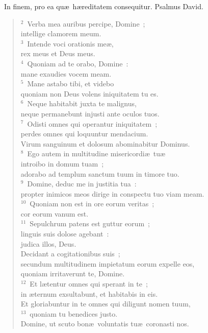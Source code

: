 ~\lettrine[lines=10,image=true,loversize=0.05,lraise=-0.03]{I}{}n finem, pro ea qu\ae\ h\ae reditatem consequitur. Psalmus David.
\begin{flushleft}\begin{verse}\vspace{6pt}${}^{2}$~Verba mea auribus percipe, Domine~;\\ intellige clamorem meum.\\
${}^{3}$~Intende voci orationis me\ae ,\\ rex meus et Deus meus.\\
${}^{4}$~Quoniam ad te orabo, Domine~:\\ mane exaudies vocem meam.\\
${}^{5}$~Mane astabo tibi, et videbo\\ quoniam non Deus volens iniquitatem tu es.\\
${}^{6}$~Neque habitabit juxta te malignus,\\ neque permanebunt injusti ante oculos tuos.\\
${}^{7}$~Odisti omnes qui operantur iniquitatem~;\\ perdes omnes qui loquuntur mendacium.\\ Virum sanguinum et dolosum abominabitur Dominus.\\
${}^{8}$~Ego autem in multitudine misericordi\ae\ tu\ae \\ introibo in domum tuam~;\\ adorabo ad templum sanctum tuum in timore tuo.\\
${}^{9}$~Domine, deduc me in justitia tua~:\\ propter inimicos meos dirige in conspectu tuo viam meam.\\
${}^{10}$~Quoniam non est in ore eorum veritas~;\\ cor eorum vanum est.\\
${}^{11}$~Sepulchrum patens est guttur eorum~;\\ linguis suis dolose agebant~:\\ judica illos, Deus.\\ Decidant a cogitationibus suis~;\\ secundum multitudinem impietatum eorum expelle eos,\\ quoniam irritaverunt te, Domine.\\
${}^{12}$~Et l\ae tentur omnes qui sperant in te~;\\ in \ae ternum exsultabunt, et habitabis in eis.\\ Et gloriabuntur in te omnes qui diligunt nomen tuum,\\
${}^{13}$~quoniam tu benedices justo.\\ Domine, ut scuto bon\ae\ voluntatis tu\ae\ coronasti nos.\end{verse}\end{flushleft}


